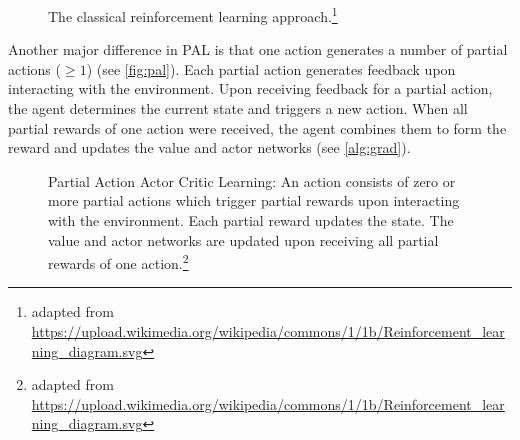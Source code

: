 \documentclass[sigconf]{acmart}
\begin{document}
\begin{figure}
\begin{minipage}{\columnwidth}

\caption{The classical reinforcement learning approach.\protect\footnote{adapted from \url{https://upload.wikimedia.org/wikipedia/commons/1/1b/Reinforcement_learning_diagram.svg}}}
\label{fig:reinforcement}
\end{minipage}
\end{figure}

Another major difference in PAL is that one action generates a number of partial actions ($\geq 1$) (see \autoref{fig:pal}). Each partial action generates feedback upon interacting with the environment. Upon receiving feedback for a partial action, the agent determines the current state and triggers a new action. When all partial rewards of one action were received, the agent combines them to form the reward and updates the value and actor networks (see \autoref{alg:grad}).

\begin{figure}
\begin{minipage}{\columnwidth}

\caption{Partial Action Actor Critic Learning: An action consists of zero or more partial actions which trigger partial rewards upon interacting with the environment. Each partial reward updates the state. The value and actor networks are updated upon receiving all partial rewards of one action.\protect\footnote{adapted from \url{https://upload.wikimedia.org/wikipedia/commons/1/1b/Reinforcement_learning_diagram.svg}}}
\label{fig:pal}
\end{minipage}
\end{figure}
\end{document}
